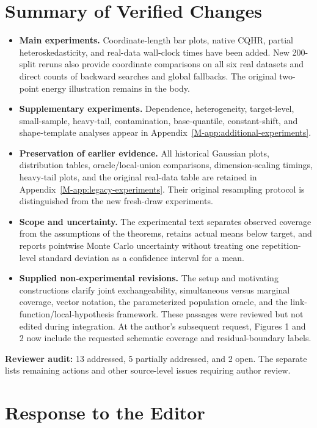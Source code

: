 \documentclass[11pt]{article}
\newcommand{\msapp}[1]{Appendix~\ref*{M-#1}}
\begin{document}
\section*{Summary of Verified Changes}
\begin{itemize}
\item \textbf{Main experiments.} Coordinate-length bar plots, native CQHR,
partial heteroskedasticity, and real-data wall-clock times have been added.
New 200-split reruns also provide coordinate comparisons on all six real
datasets and direct counts of backward searches and global fallbacks.
The original two-point energy illustration remains in the body.
\item \textbf{Supplementary experiments.} Dependence, heterogeneity, target-level,
small-sample, heavy-tail, contamination, base-quantile, constant-shift, and
shape-template analyses appear in \msapp{app:additional-experiments}.
\item \textbf{Preservation of earlier evidence.} All historical Gaussian plots,
distribution tables, oracle/local-union comparisons, dimension-scaling timings,
heavy-tail plots, and the original real-data table are retained in
\msapp{app:legacy-experiments}. Their original resampling protocol is
distinguished from the new fresh-draw experiments.
\item \textbf{Scope and uncertainty.} The experimental text separates observed
coverage from the assumptions of the theorems, retains actual means below
target, and reports pointwise Monte Carlo uncertainty without treating one
repetition-level standard deviation as a confidence interval for a mean.
\item \textbf{Supplied non-experimental revisions.} The setup and motivating
constructions clarify joint exchangeability, simultaneous versus marginal
coverage, vector notation, the parameterized population oracle, and the
link-function/local-hypothesis framework. These passages were reviewed but
not edited during integration. At the author's subsequent request, Figures 1
and 2 now include the requested schematic coverage and residual-boundary labels.
\end{itemize}
\textbf{Reviewer audit:} 13 addressed, 5 partially addressed, and 2 open.
The separate  lists remaining
actions and other source-level issues requiring author review.

\clearpage
\section*{Response to the Editor}
\end{document}
